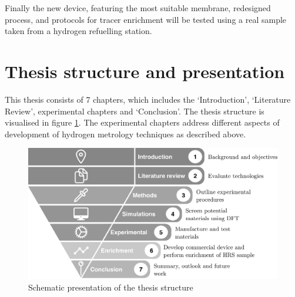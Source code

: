 Finally the new device, featuring the most suitable membrane, redesigned process, and protocols for tracer enrichment will be tested using a real sample taken from a hydrogen refuelling station.

\section{Thesis structure and presentation}
This thesis consists of 7 chapters, which includes the ‘Introduction’, ‘Literature Review’, 
experimental chapters and ‘Conclusion’. The thesis structure is visualised in figure \ref{funnel}. 
The experimental chapters address different aspects of development of hydrogen metrology techniques as 
described above. 

\begin{figure}[H]
  \includegraphics[width=\linewidth]{figures/funnel.png}
  \caption{Schematic presentation of the thesis structure}
  \label{funnel}
\end{figure}


\renewcommand{\bibname}{References}


